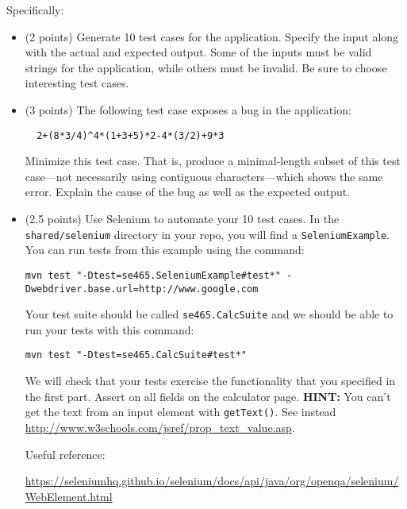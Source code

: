 \documentclass[10pt,hidelinks]{article}
\begin{document}
Specifically:

\begin{itemize}
\item (2 points) Generate 10 test cases for the application. Specify the input along with the actual and expected output. Some of the inputs must be valid strings for the application, while others must be invalid. Be sure to choose interesting test cases.

\item (3 points) The following test case exposes a bug in the application:

\begin{verbatim}
  2+(8*3/4)^4*(1+3+5)*2-4*(3/2)+9*3
\end{verbatim}

Minimize this test case. That is, produce a minimal-length subset of this test case---not necessarily using contiguous characters---which shows the same error. Explain the cause of the bug as well as the expected output.

\item (2.5 points) Use Selenium to automate your 10 test cases. In the {\tt shared/selenium} directory in your repo, you will find a {\tt SeleniumExample}. You can run tests from this example using the command:

\begin{verbatim}
mvn test "-Dtest=se465.SeleniumExample#test*" -Dwebdriver.base.url=http://www.google.com
\end{verbatim}

Your test suite should be called {\tt se465.CalcSuite} and we should be able to run your tests with this command:

\begin{verbatim}
mvn test "-Dtest=se465.CalcSuite#test*"
\end{verbatim}

We will check that your tests exercise the functionality that you specified in the first part.
Assert on all fields on the calculator page.
{\bf HINT:} You can't get the text from an input element with {\tt getText()}. See instead
\url{http://www.w3schools.com/jsref/prop_text_value.asp}.

Useful reference:

\url{https://seleniumhq.github.io/selenium/docs/api/java/org/openqa/selenium/WebElement.html}

\end{itemize}
\end{document}
